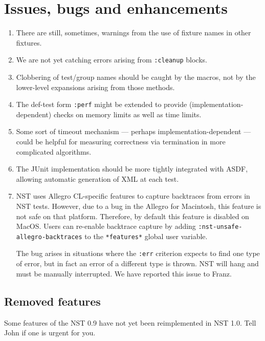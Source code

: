 
\section{Issues, bugs and enhancements}
\begin{enumerate}
\item There are still, sometimes, warnings from the use of fixture
  names in other fixtures.
\item We are not yet catching errors arising from
  \texttt{:cleanup} blocks.
\item Clobbering of test/group names should be caught by the macros,
  not by the lower-level expansions arising from those methods.
\item The def-test form \texttt{:perf} might be extended to provide
  (implementation-dependent) checks on memory limits as well as time
  limits.
\item Some sort of timeout mechanism --- perhaps
  implementation-dependent --- could be helpful for measuring
  correctness via termination in more complicated algorithms.
\item The JUnit implementation should be more tightly integrated with
  ASDF, allowing automatic generation of XML at each test.
\item NST uses Allegro CL-specific features to capture backtraces from
  errors in NST tests.  However, due to a bug in the Allegro for
  Macintosh, this feature is not safe on that platform.  Therefore, by
  default this feature is disabled on MacOS.  Users can re-enable
  backtrace capture by adding \texttt{:nst-unsafe-allegro-backtraces}
  to the \texttt{*features*} global user
  variable.

  The bug arises in situations where the \texttt{:err} criterion
  expects to find one type of error, but in fact an error of a
  different type is thrown.  NST will hang and must be manually
  interrupted.  We have reported this issue to
  Franz.
\end{enumerate}

\subsection{Removed features}
\label{temp-removed}
Some features of the NST 0.9 have not yet been reimplemented in NST
1.0.  Tell John if one is urgent for you.

